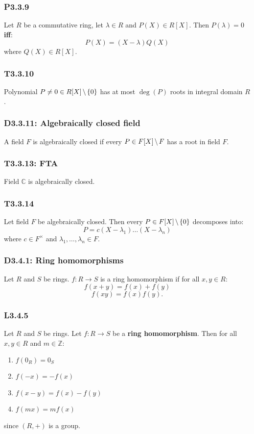 \documentclass{article}
\begin{document}
\begin{multicols*}{3}
\subsubsection*{P3.3.9}
Let $R$ be a commutative ring, let $\lambda\in R$
and $P(X)\in R[X]$. Then $P(\lambda)=0$ \textbf{if{}f}:
$$P(X)=(X-\lambda)Q(X)$$
where $Q(X)\in R[X]$.

\subsubsection*{T3.3.10}
Polynomial
$P\neq0\in R[X]\hspace{0.02in}\backslash\hspace{0.02in}\{0\}$
has at most $\deg(P)$ roots in integral domain $R$.

\subsubsection*{D3.3.11: Algebraically closed field}
A field $F$ is algebraically closed if every
$P\in F[X]\hspace{0.02in}\backslash\hspace{0.02in}F$
has a root in field $F$.

\subsubsection*{T3.3.13: FTA}
Field $\mathbb{C}$ is algebraically closed.

\subsubsection*{T3.3.14}
Let field $F$ be algebraically closed. Then every
$P\in F[X]\hspace{0.02in}\backslash\hspace{0.02in}\{0\}$
decomposes into:
$$P=c(X-\lambda_1)\dots(X-\lambda_n)$$
where $c\in F^{\times}$ and $\lambda_1,\dots,\lambda_n\in F$.

\subsubsection*{D3.4.1: Ring homomorphisms}
Let $R$ and $S$ be rings. $f:R\rightarrow S$ is a ring
homomorphism if for all $x,y\in R$:
$$f(x+y)=f(x)+f(y)$$
$$f(xy)=f(x)f(y).$$

\subsubsection*{L3.4.5}
Let $R$ and $S$ be rings. Let $f:R\rightarrow S$ be a
\textbf{ring homomorphism}.
Then for all $x,y\in R$ and $m\in\mathbb{Z}$:
\begin{enumerate}
    \item $f(0_R)=0_S$
    \item $f(-x)=-f(x)$
    \item $f(x-y)=f(x)-f(y)$
    \item $f(mx)=mf(x)$
\end{enumerate}
since $(R,+)$ is a group.


\end{multicols*}
\end{document}
